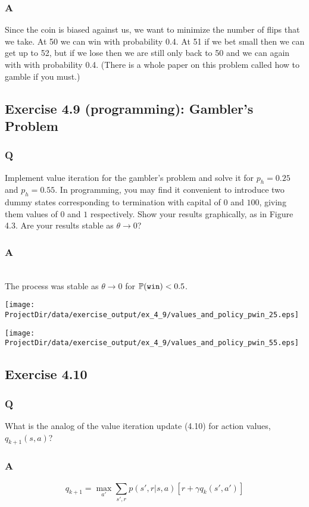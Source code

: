 \subsubsection{A}
Since the coin is biased against us, we want to minimize the number of flips that we take. At 50 we can win with probability 0.4. At 51 if we bet small then we can get up to 52, but if we lose then we are still only back to 50 and we can again with with probability 0.4. (There is a whole paper on this problem called how to gamble if you must.)


\subsection{Exercise 4.9 (programming): Gambler's Problem}
\subsubsection{Q}
Implement value iteration for the gambler's problem and solve it for $p_h = 0.25$ and $p_h = 0.55$. In programming, you may find it convenient to introduce two dummy states corresponding to termination with capital of $0$ and $100$, giving them values of $0$ and $1$ respectively. Show your results graphically, as in Figure 4.3. Are your results stable as $\theta \to 0$?

\subsubsection{A}
\ProgrammingExercise\\

The process was stable as $\theta \to 0$ for $\P{}(\mathtt{win}) < 0.5$.

\texttt{[image: \\ProjectDir/data/exercise\_output/ex\_4\_9/values\_and\_policy\_pwin\_25.eps]}

\texttt{[image: \\ProjectDir/data/exercise\_output/ex\_4\_9/values\_and\_policy\_pwin\_55.eps]}

\subsection{Exercise 4.10}
\subsubsection{Q}
What is the analog of the value iteration update (4.10) for action values, $q_{k+1}(s, a)$?

\subsubsection{A}
\begin{equation}
    q_{k+1} = \max_{a'} \sum_{s', r} p(s', r| s, a)\left[r + \gamma q_k(s', a')\right]
\end{equation}

